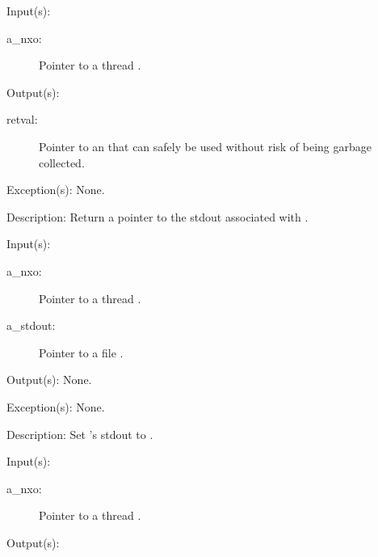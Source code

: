 \begin{capi}
\begin{capilist}
	\item[Input(s): ]
		\begin{description}\item[]
		\item[a\_nxo: ]
			Pointer to a thread .
		\end{description}
	\item[Output(s): ]
		\begin{description}\item[]
		\item[retval: ]
			Pointer to an  that can safely be used
			without risk of being garbage collected.
		\end{description}
	\item[Exception(s): ] None.
	\item[Description: ]
		Return a pointer to the stdout associated with .
	\end{capilist}
\label{nxo_thread_stdout_set}
	\begin{capilist}
	\item[Input(s): ]
		\begin{description}\item[]
		\item[a\_nxo: ]
			Pointer to a thread .
		\item[a\_stdout: ]
			Pointer to a file .
		\end{description}
	\item[Output(s): ] None.
	\item[Exception(s): ] None.
	\item[Description: ]
		Set 's stdout to .
	\end{capilist}
\label{nxo_thread_stderr_get}
	\begin{capilist}
	\item[Input(s): ]
		\begin{description}\item[]
		\item[a\_nxo: ]
			Pointer to a thread \classname{nxo}.
		\end{description}
	\item[Output(s): ]
		\begin{description}\item[]

\end{description}
\end{capilist}
\end{capi}
